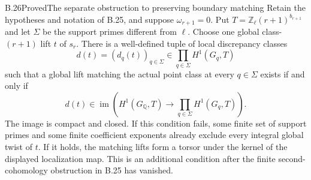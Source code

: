\begin{result}{B.26}{Proved}{The separate obstruction to preserving boundary matching}
\label{coh:matchingobstruction}
Retain the hypotheses and notation of B.25, and suppose
$\omega_{r+1}=0$. Put $T=\mathbb Z_\ell(r+1)^{b_{r+1}}$ and
let $\Sigma$ be the support primes different from $\ell$.
Choose one global class-$(r+1)$ lift $t$ of $s_r$. There is a
well-defined tuple of local discrepancy classes
\[
 d(t)=(d_q(t))_{q\in\Sigma}\in
       \prod_{q\in\Sigma}H^1(G_q,T)
\]
such that a global lift matching the actual point class at every
$q\in\Sigma$ exists if and only if
\[
 d(t)\in\operatorname{im}\left(
 H^1(G_{\mathbb Q},T)\longrightarrow
                     \prod_{q\in\Sigma}H^1(G_q,T)\right).
\]
The image is compact and closed. If this condition fails, some finite
set of support primes and some finite coefficient exponents already
exclude every integral global twist of $t$. If it holds, the matching
lifts form a torsor under the kernel of the displayed localization map.
This is an additional condition after the finite second-cohomology
obstruction in B.25 has vanished.
\end{result}
